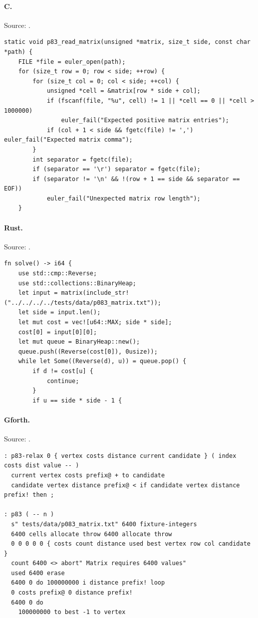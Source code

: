 \paragraph{C.} Source: .
\begin{lstlisting}
static void p83_read_matrix(unsigned *matrix, size_t side, const char *path) {
    FILE *file = euler_open(path);
    for (size_t row = 0; row < side; ++row) {
        for (size_t col = 0; col < side; ++col) {
            unsigned *cell = &matrix[row * side + col];
            if (fscanf(file, "%u", cell) != 1 || *cell == 0 || *cell > 1000000)
                euler_fail("Expected positive matrix entries");
            if (col + 1 < side && fgetc(file) != ',') euler_fail("Expected matrix comma");
        }
        int separator = fgetc(file);
        if (separator == '\r') separator = fgetc(file);
        if (separator != '\n' && !(row + 1 == side && separator == EOF))
            euler_fail("Unexpected matrix row length");
    }
\end{lstlisting}

\paragraph{Rust.} Source: .
\begin{lstlisting}
fn solve() -> i64 {
    use std::cmp::Reverse;
    use std::collections::BinaryHeap;
    let input = matrix(include_str!("../../../../tests/data/p083_matrix.txt"));
    let side = input.len();
    let mut cost = vec![u64::MAX; side * side];
    cost[0] = input[0][0];
    let mut queue = BinaryHeap::new();
    queue.push((Reverse(cost[0]), 0usize));
    while let Some((Reverse(d), u)) = queue.pop() {
        if d != cost[u] {
            continue;
        }
        if u == side * side - 1 {
\end{lstlisting}

\paragraph{Gforth.} Source: .
\begin{lstlisting}
: p83-relax 0 { vertex costs distance current candidate } ( index costs dist value -- )
  current vertex costs prefix@ + to candidate
  candidate vertex distance prefix@ < if candidate vertex distance prefix! then ;

: p83 ( -- n )
  s" tests/data/p083_matrix.txt" 6400 fixture-integers
  6400 cells allocate throw 6400 allocate throw
  0 0 0 0 0 { costs count distance used best vertex row col candidate }
  count 6400 <> abort" Matrix requires 6400 values"
  used 6400 erase
  6400 0 do 100000000 i distance prefix! loop
  0 costs prefix@ 0 distance prefix!
  6400 0 do
    100000000 to best -1 to vertex
\end{lstlisting}


